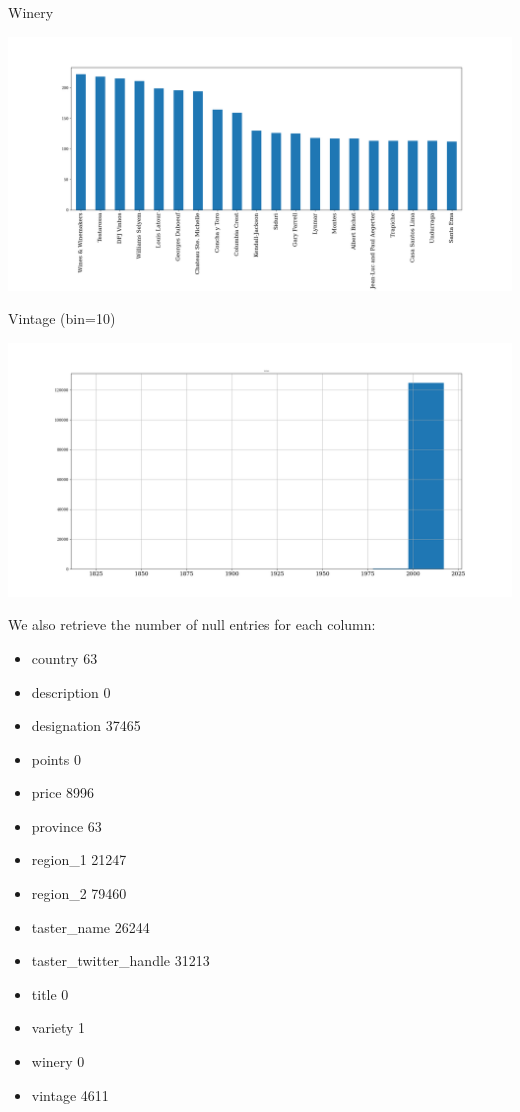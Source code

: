 \documentclass[11pt]{article}
\begin{document}
Winery

\includegraphics[width=\textwidth,height=\textheight,keepaspectratio]{figures/1c_histogram_of_winery.png}

Vintage (bin=10)

\includegraphics[width=\textwidth,height=\textheight,keepaspectratio]{figures/1c_histogram_of_vintage.png}

We also retrieve the number of null entries for each column:

\begin{itemize}
    \item country                     63
    \item description                  0
    \item designation              37465
    \item points                       0
    \item price                     8996
    \item province                    63
    \item region\_1                 21247
    \item region\_2                 79460
    \item taster\_name              26244
    \item taster\_twitter\_handle    31213
    \item title                        0
    \item variety                      1
    \item winery                       0
    \item vintage                   4611
\end{itemize}
\end{document}
